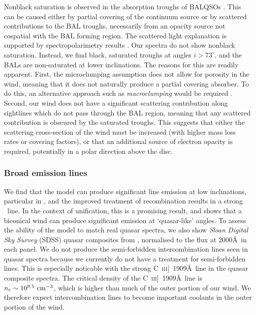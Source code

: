 \documentclass[useAMS,usenatbib]{mn2e_x}
\begin{document}
Nonblack saturation is observed in the absorption troughs of BALQSOs \citep{arav1999a,arav1999b}.
This can be caused either by partial covering of the continuum
source or by scattered contributions to the BAL troughs, necessarily
from an opacity source not cospatial with the BAL forming region.
The scattered light explanation is supported by spectropolarimetry results
\citep{lamy2000}. Our spectra do not show nonblack saturation.
Instead, we find black, saturated troughs at angles $i > 73^\circ$, and the BALs
are non-saturated at lower inclinations. The reasons for this are readily apparent. 
First, the microclumping assumption does not allow for 
porosity in the wind, meaning that it does not naturally produce
a partial covering absorber. To do this, an alternative approach
such as {\em macroclumping} would be required \citep[e.g.][]{surlan2012,hamann2008}.
Second, our wind does not have a significant scattering 
contribution along sightlines which do not pass through the BAL region,
meaning that any scattered contribution is obscured by the saturated troughs.
This suggests that either the scattering cross-section of the wind must
be increased (with higher mass loss rates or covering factors), or 
that an additional source of electron opacity is required, potentially
in a polar direction above the disc.


\subsubsection{Broad emission lines}

We find that the model can produce significant line emission
at low inclinations, particular in \civ, 
and the improved treatment of recombination results in a strong \la\
line. In the context of unification, this is a promising result, 
and shows that a biconical wind can produce significant 
emission at `quasar-like' angles. To assess the ability of the model to match real 
quasar spectra, we also show {\sl Sloan Digital Sky Survey} (SDSS) quasar composites from
\cite{reichard2003}, normalised to the flux at 2000\AA\ in each panel.
We do not produce the semi-forbidden 
intercombination lines seen in quasar spectra because we
currently do not have a treatment for semi-forbidden lines.
This is especially noticable with the strong C~\textsc{iii}]~1909\AA\, 
line in the quasar composite spectra.
The critical density of the C~\textsc{iii}]~1909\AA\, line 
is $n_e\sim10^{9.5}~\rm{cm^{-3}}$, which is higher than much of the 
outer portion of our wind. We therefore expect intercombination lines
to become important coolants in the outer portion of the wind.
\end{document}

